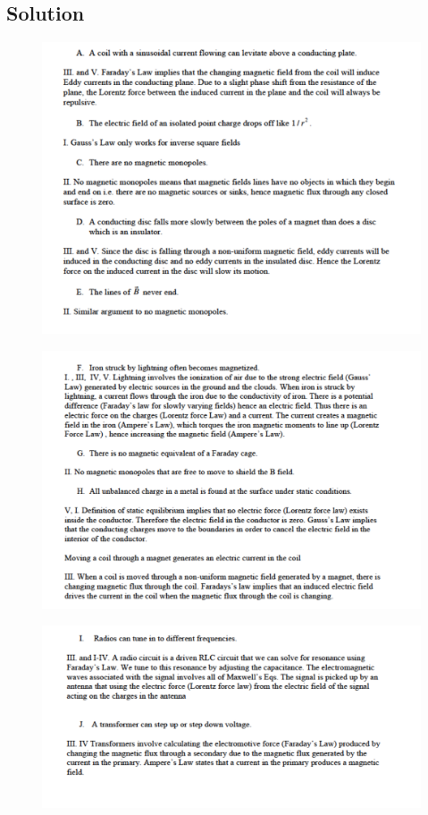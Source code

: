 \documentclass[solutions]{esg8022pset}
\begin{document}
\subsection{Solution}
\begin{figure}[H]
    \centering
    \includegraphics[width = 15cm]{max_gen_sola}
  \end{figure}
  \begin{figure}[H]
    \centering
    \includegraphics[width = 15cm]{max_gen_solb}
  \end{figure}
  \begin{figure}[H]
    \centering
    \includegraphics[width = 15cm]{max_gen_solc}
  \end{figure}
\end{document}
